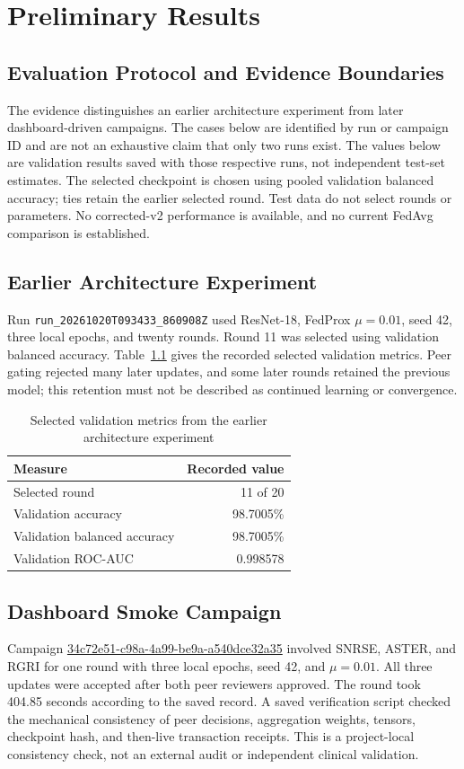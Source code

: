 \documentclass[12pt,a4paper]{report}
\begin{document}
\chapter{Preliminary Results}
\section{Evaluation Protocol and Evidence Boundaries}
The evidence distinguishes an earlier architecture experiment from later dashboard-driven campaigns. The cases below are identified by run or campaign ID and are not an exhaustive claim that only two runs exist. The values below are validation results saved with those respective runs, not independent test-set estimates. The selected checkpoint is chosen using pooled validation balanced accuracy; ties retain the earlier selected round. Test data do not select rounds or parameters. No corrected-v2 performance is available, and no current FedAvg comparison is established.

\section{Earlier Architecture Experiment}
Run \texttt{run\_20261020T093433\_860908Z} used ResNet-18, FedProx $\mu=0.01$, seed 42, three local epochs, and twenty rounds. Round 11 was selected using validation balanced accuracy. Table~\ref{tab:architecture-run} gives the recorded selected validation metrics. Peer gating rejected many later updates, and some later rounds retained the previous model; this retention must not be described as continued learning or convergence.

\begin{table}[htbp]
\centering
\caption{Selected validation metrics from the earlier architecture experiment}
\label{tab:architecture-run}
\begin{tabular}{lr}
\toprule
\textbf{Measure} & \textbf{Recorded value} \\
\midrule
Selected round & 11 of 20 \\
Validation accuracy & 98.7005\% \\
Validation balanced accuracy & 98.7005\% \\
Validation ROC-AUC & 0.998578 \\
\bottomrule
\end{tabular}
\end{table}

\section{Dashboard Smoke Campaign}
Campaign \url{34c72e51-c98a-4a99-be9a-a540dce32a35} involved SNRSE, ASTER, and RGRI for one round with three local epochs, seed 42, and $\mu=0.01$. All three updates were accepted after both peer reviewers approved. The round took 404.85 seconds according to the saved record. A saved verification script checked the mechanical consistency of peer decisions, aggregation weights, tensors, checkpoint hash, and then-live transaction receipts. This is a project-local consistency check, not an external audit or independent clinical validation.
\end{document}
